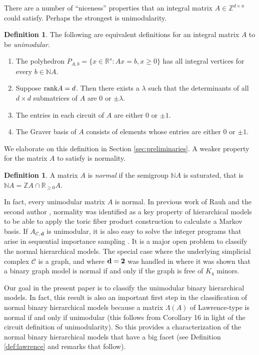 \documentclass[letterpaper,12pt]{amsart}
\theoremstyle{plain}
\theoremstyle{definition}
\newtheorem{defn}[thm]{Definition}
\theoremstyle{remark}
\newcommand{\zz}{\mathbb{Z}}
\newcommand{\nn}{\mathbb{N}}
\newcommand{\rr}{\mathbb{R}}
\newcommand{\bfd}{\mathbf{d}}
\newcommand{\calc}{\mathcal{C}}
\newcommand{\rank}{\textnormal{rank}}
\begin{document}
There are a number of ``niceness'' properties that an integral matrix $A \in \zz^{d \times n}$ 
could satisfy.  Perhaps the strongest is unimodularity.  
\begin{defn}\label{def:unimodular}
The following are equivalent definitions for an integral matrix $A$ to be \emph{unimodular}.
\begin{enumerate}
\item  The polyhedron $P_{A,b} = \{x \in \rr^s : Ax = b, x \ge 0\}$
 has all integral vertices for every $b \in \nn A$.
\item  Suppose $\rank A = d$.  Then there exists a $\lambda$ such that
 the determinants of all $d \times d$ submatrices of $A$ are $0$ or $\pm \lambda$.
\item  The entries in each circuit of $A$ are either $0$ or $\pm 1$.
\item  The Graver basis of $A$ consists of elements whose entries
are either $0$ or $\pm 1$.
\end{enumerate}
\end{defn}
We elaborate on this definition in Section \ref{sec:preliminaries}.
A weaker property for the matrix $A$ to satisfy is normality.
\begin{defn}
A matrix $A$ is \emph{normal} if the semigroup $\nn A$ is saturated, that is
$\nn A  =  \zz A  \cap  \rr_{\geq 0} A$.
\end{defn}

In fact, every unimodular matrix $A$ is normal.  In previous work
of Rauh and the second author \cite{Rauh2014}, normality was identified as a key
property of hierarchical models to be able to apply the toric fiber product  
construction to calculate a Markov basis.  {If $A_{\calc, \bfd}$
is unimodular, it is also easy to solve the integer programs that arise
in sequential importance sampling \cite{Chen2006}.}
  It is a major open problem to classify the 
normal hierarchical models.  The special case where the underlying simplicial complex
$\calc$ is a graph, and where $\bfd = {\bf 2}$ was
handled in \cite{Sullivant2010} where it was shown that a binary graph
model is normal if and only if the graph is free of $K_4$ minors.

Our goal in the present paper is to classify the unimodular binary
hierarchical models.  In fact, this result is also an important first
step in the classification of normal binary hierarchical models because
a matrix $\Lambda(A)$ of Lawrence-type is normal
if and only if unimodular (this follows from \cite{indispensable} Corollary 16 in light of the circuit definition of unimodularity).
So this provides a characterization of the normal binary hierarchical models that have a big facet
(see Definition \ref{def:lawrence} and remarks that follow).
\end{document}
